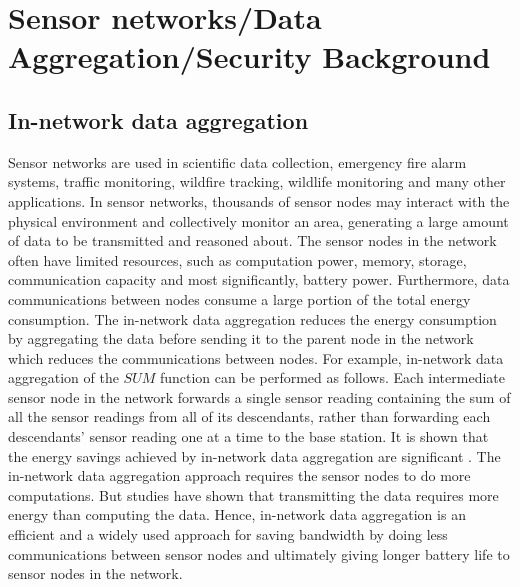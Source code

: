 \chapter{Sensor networks/Data Aggregation/Security Background} 
\label{cha:Sensor networks/Data Aggregation/Security Background}

\section{In-network data aggregation}
	Sensor networks are used in scientific data collection, emergency fire alarm systems, traffic monitoring, wildfire tracking, wildlife monitoring and many other applications.
	In sensor networks, thousands of sensor nodes may interact with the physical environment and collectively monitor an area, generating a large amount of data to be transmitted and reasoned about.
	The sensor nodes in the network often have limited resources, such as computation power, memory, storage, communication capacity and most significantly, battery power.
	Furthermore, data communications between nodes consume a large portion of the total energy consumption. 
	The in-network data aggregation reduces the energy consumption by aggregating the data before sending it to the parent node in the network which reduces the communications between nodes.
	For example, in-network data aggregation of the $\textit{SUM}$ function can be performed as follows. 
	Each intermediate sensor node in the network forwards a single sensor reading containing the sum of all the sensor readings from all of its descendants, rather than forwarding each descendants' sensor reading one at a time to the base station.
	It is shown that the energy savings achieved by in-network data aggregation are significant \cite{madden2002tag}.
	The in-network data aggregation approach requires the sensor nodes to do more computations.
	But studies have shown that transmitting the data requires more energy than computing the data. 
	Hence, in-network data aggregation is an efficient and a widely used approach for saving bandwidth by doing less communications between sensor nodes and ultimately giving longer battery life to sensor nodes in the network.


